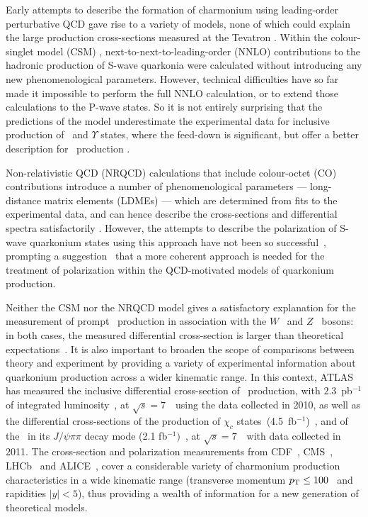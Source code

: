 Early attempts to describe the formation of charmonium
\cite{CSM1,CSM2,CSM3,CSM4,CSM5,CSM7,CEM1,CEM2}
using leading-order perturbative QCD 
gave rise to a variety of models, none of which could explain the
large production cross-sections measured at the Tevatron
\cite{CDFjpsianomaly1,CDFjpsianomaly2,CDFjpsianomaly3,D0jpsi1,D0jpsi2}.
Within the colour-singlet model (CSM) \cite{Lansberg:2008gk}, next-to-next-to-leading-order (NNLO) contributions to the hadronic production of S-wave
quarkonia were calculated without introducing any new phenomenological parameters. However,
technical difficulties have so far made it impossible to perform the full NNLO calculation, or to 
extend those calculations to the P-wave states. 
So it is not entirely surprising that the predictions of the model underestimate the experimental data for inclusive production of
\jpsi\ and $\Upsilon$ states, where the feed-down is significant, but offer a better description  for \psiprime\ production \cite{Aad:2011sp,Aad2012dlq}.

Non-relativistic QCD (NRQCD) calculations that include colour-octet (CO) contributions 
\cite{Bodwin:1994jh} introduce a number of phenomenological parameters --- long-distance matrix elements
(LDMEs) --- which are determined from fits to the experimental data, and can hence
describe the cross-sections and differential spectra satisfactorily 
{\cite{CO_LDME1}}. 
However, the attempts to describe the polarization of S-wave quarkonium states using this approach
have not been so successful~\cite{Gong:2012ug},
prompting a suggestion~\cite{Faccioli:2014cqa} that a more coherent approach is needed for the treatment of polarization
within the QCD-motivated models of quarkonium production. 

Neither the CSM nor the NRQCD model gives a satisfactory explanation for the measurement of prompt
\jpsi\ production in association with the $W$~\cite{Aad:2014rua} and $Z$~\cite{Aad:2014kba} bosons: in both cases,
the measured differential cross-section is larger than theoretical expectations~\cite{Li:2010hc,Lansberg:2013wva,Gong:2012ah, Mao:2011kf}.
It is also important to broaden the scope of comparisons 
between theory and experiment by providing a variety of experimental information
about quarkonium production across a wider kinematic range.
In this context, ATLAS has measured the inclusive differential cross-section of \jpsi\  production, with $2.3$~pb$^{-1}$ of integrated luminosity~\cite{Aad:2011sp}, 
at $\sqrt{s} = 7$~\TeV\ using the data collected in 2010, 
as well as the differential cross-sections of the production of  $\chi_c$ states~(4.5~fb$^{-1}$)~\cite{ATLAS:2014ala}, and of the \psiprime\ in its $J/\psi\pi\pi$ decay mode (2.1 fb$^{-1})$~\cite{Aad:2014fpa}, at $\sqrt{s} = 7$~\TeV\ with data collected in 2011.
The cross-section and polarization measurements 
from CDF~\cite{Abulencia:2007us},
CMS~\cite{Chatrchyan:2013cla,Khachatryan:2010yr,CMS},
LHCb~\cite{Aaij:2012ag,Aaij:2013jxj,Aaij:2013yaa,Aaij:2012asz,Aaij:2013nlm,Aaij:2014qea}  
and ALICE~\cite{Abelev:2014qha,Abelev:2011md,Aamodt:2011gj},
cover a considerable variety of charmonium production characteristics in a wide 
kinematic range (transverse momentum $\mbox{$p_{\text{T}}$}\leq 100$ \GeV\ and rapidities $|y|<5$), thus providing a wealth of
information for a new generation of theoretical models.

